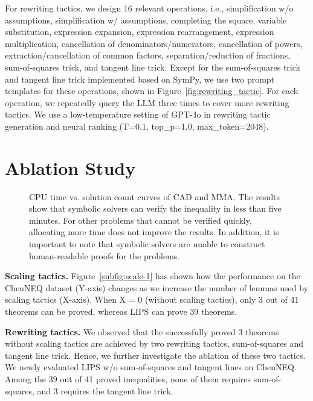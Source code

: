 For rewriting tactics, we design 16 relevant operations, i.e., simplification w/o assumptions, simplification w/ assumptions, completing the square, variable substitution, expression expansion, expression rearrangement, expression multiplication, cancellation of denominators/numerators, cancellation of powers, extraction/cancellation of common factors, separation/reduction of fractions, sum-of-squares trick, and tangent line trick.
Except for the sum-of-squares trick and tangent line trick implemented based on SymPy, 
we use two prompt templates for these operations, shown in Figure~\ref{fig:rewriting_tactic}. 
For each operation, we repeatedly query the LLM three times to cover more rewriting tactics.
We use a low-temperature setting of GPT-4o in rewriting tactic generation and neural ranking (T=0.1, top\_p=1.0, max\_token=2048).

\section{Ablation Study} \label{app:ablation_study}

\begin{figure}[ht] 
\centering
{}
\hfill
{}
\vspace{-0.75em}
\caption{CPU time vs. solution count curves of CAD and MMA. 
The results show that symbolic solvers can verify the inequality in less than five minutes. For other problems that cannot be verified quickly, allocating more time does not improve the results.
In addition, it is important to note that symbolic solvers are unable to construct human-readable proofs for the problems. }
\label{fig:curves}
\vspace{-1.0em}
\end{figure}

{\bf Scaling tactics.} 
Figure~\ref{subfig:scale-1} has shown how the performance on the ChenNEQ dataset (Y-axis) changes as we increase the number of lemmas used by scaling tactics (X-axis). When X = 0 (without scaling tactics), only 3 out of 41 theorems can be proved, whereas LIPS can prove 39 theorems.

{\bf Rewriting tactics.}
We observed that the successfully proved 3 theorems without scaling tactics are achieved by two rewriting tactics, sum-of-squares and tangent line trick. 
Hence, we further investigate the ablation of these two tactics. 
We newly evaluated LIPS w/o sum-of-squares and tangent lines on ChenNEQ. Among the 39 out of 41 proved inequalities, none of them requires sum-of-squares, and 3 requires the tangent line trick.

